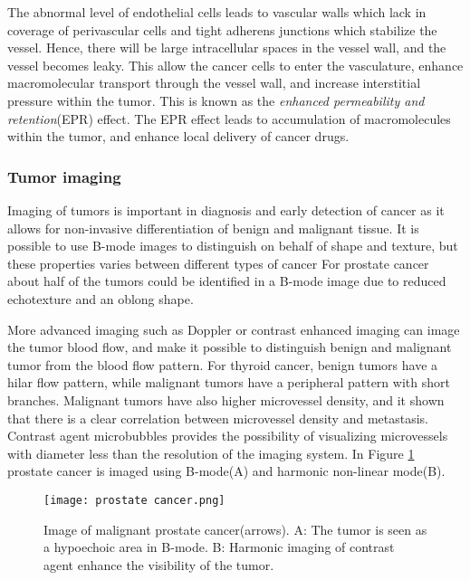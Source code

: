 The abnormal level of endothelial cells leads to vascular walls which lack in coverage of perivascular cells and tight adherens junctions which stabilize the vessel. Hence, there will be large intracellular spaces in the vessel wall, and the vessel becomes leaky. This allow the cancer cells to enter the vasculature, enhance macromolecular transport through the vessel wall, and increase interstitial pressure within the tumor. This is known as the \textit{enhanced permeability and retention}(EPR) effect. The EPR effect leads to accumulation of macromolecules within the tumor, and enhance local delivery of cancer drugs.



\subsubsection{Tumor imaging}
Imaging of tumors is important in diagnosis and early detection of cancer as it allows for non-invasive differentiation of benign and malignant tissue. It is possible to use B-mode images to distinguish on behalf of shape and texture, but these properties varies between different types of cancer For prostate cancer about half of the tumors could be identified in a B-mode image due to reduced echotexture and an oblong shape\cite{Halpern2006}. 

More advanced imaging such as Doppler or contrast enhanced imaging can image the tumor blood flow, and make it possible to distinguish benign and malignant tumor from the blood flow pattern. For thyroid cancer, benign tumors have a hilar flow pattern, while malignant tumors have a peripheral pattern with short branches\cite{Go2003}. Malignant tumors have also higher microvessel density, and it shown that there is a clear correlation between microvessel density and metastasis\cite{Rifkin1990}. Contrast agent microbubbles provides the possibility of visualizing microvessels with diameter less than the resolution of the imaging system. In Figure \ref{Fig:prostate cancer} prostate cancer is imaged using B-mode(A) and harmonic non-linear mode(B).

\begin{figure}[h]
  \centering
  \label{Fig:prostate cancer}
  \texttt{[image: prostate cancer.png]}
  \caption{Image of malignant prostate cancer(arrows)\cite{Halpern2006}. A: The tumor is seen as a hypoechoic area in B-mode. B: Harmonic imaging of contrast agent enhance the visibility of the tumor.}
\end{figure}

